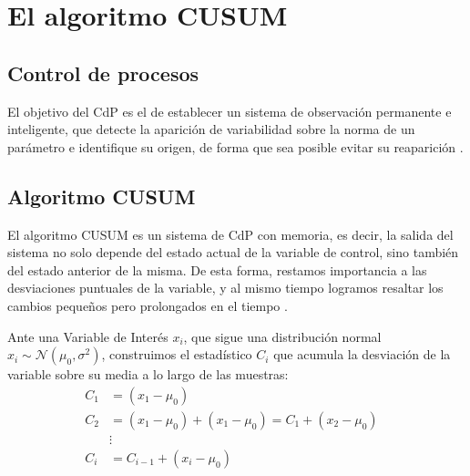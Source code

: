 \section{El algoritmo CUSUM}\label{sec:CUSUM}

\subsection{Control de procesos}
El objetivo del \gls{CdP} es el de establecer un sistema de observación permanente e inteligente,
que detecte la aparición de variabilidad sobre la norma de un parámetro e identifique su origen, de forma que 
sea posible evitar su reaparición \cite{Control_de_procesos}. %

\subsection{Algoritmo CUSUM}
El algoritmo CUSUM es un sistema de \gls{CdP} con memoria, es decir, la salida del
sistema no solo depende del estado actual de la variable de control, sino también del
estado anterior de la misma. De esta forma, restamos importancia a las desviaciones 
puntuales de la variable, y al mismo tiempo logramos resaltar los cambios pequeños
pero prolongados en el tiempo \cite{CUSUM_Carlos_III}.

Ante una Variable de Interés $x_i$, que sigue una distribución normal 
$x_i \sim\mathcal{N}\left(\mu_0,\sigma^2\right)$, 
construimos el estadístico $C_i$ que acumula la desviación de la variable sobre su media
a lo largo de las muestras:
\begin{align*}
 C_1 &= (x_1 - \mu_0) \nonumber\\
 C_2 &= (x_1 - \mu_0) + (x_1 - \mu_0) = C_1 + (x_2-\mu_0) \nonumber\\
 &\vdots& \nonumber\\
 C_i &= C_{i-1} + (x_i-\mu_0)
\end{align*}

